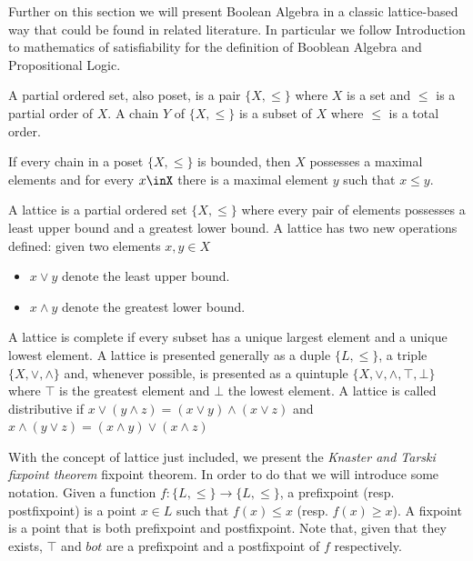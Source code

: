 Further on this section we will present Boolean Algebra in a classic lattice-based way that could be found in related literature. In particular we follow Introduction to mathematics of satisfiability\cite{marek2009introduction} for the definition of Booblean Algebra and Propositional Logic.

\begin{definition}
  A partial ordered set, also poset, is a pair $\{X, \le\}$ where $X$ is a set and $\le$ is a partial order of $X$. A chain $Y$ of $\{X, \le\}$ is a subset of $X$ where $\le$ is a total order. 
\end{definition}

\begin{proposition}
  If every chain in a poset $\{X,\le\}$ is bounded, then $X$ possesses a maximal elements and for every $x\inX$ there is a maximal element $y$ such that $x\le y$.
\end{proposition}



\begin{definition} A lattice is a partial ordered set $\{X,\le\}$ where every pair of elements possesses a least upper bound and a greatest lower bound. A lattice has two new operations defined: given two elements $x,y\in X$
  \begin{itemize}
  \item $x\vee y$ denote the least upper bound.
  \item $x\wedge y$  denote the greatest lower bound.
  \end{itemize}
\end{definition}


  A lattice is complete if every subset has a unique largest element and a unique lowest element. A lattice is presented generally as a duple $\{L,\le\}$, a triple $\{X,\vee,\wedge\}$ and, whenever possible, is presented as a quintuple $\{X, \vee, \wedge, \top,\bot\}$ where $\top$ is the greatest element and $\bot$ the lowest element. A lattice is called distributive if $x\vee(y \wedge z) = (x\vee y) \wedge (x \vee z)$ and $x\wedge(y \vee z) = (x\wedge y) \vee (x \wedge z)$



With the concept of lattice just included, we present the \emph{Knaster and Tarski fixpoint theorem} fixpoint theorem. In order to do that we will introduce some notation. Given a function $f:\{L,\le\}\to \{L,\le\}$, a prefixpoint (resp. postfixpoint) is a point $x \in L$ such that $f(x) \le x$ (resp. $f(x) \ge x$). A fixpoint is a point that is both prefixpoint and postfixpoint. Note that, given that they exists, $\top$ and $bot$ are a prefixpoint and a postfixpoint of $f$ respectively.

